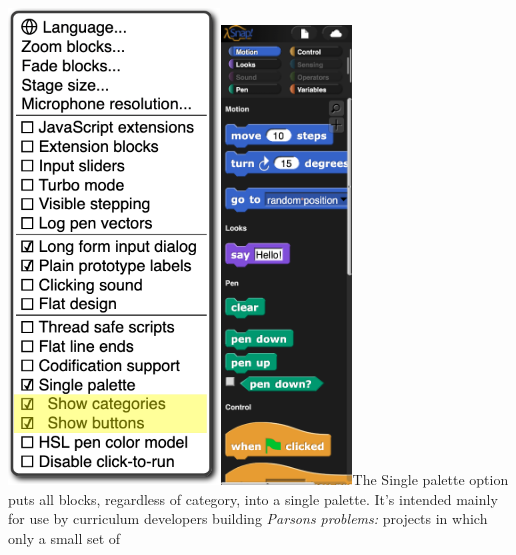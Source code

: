 \includegraphics[width=2.20972in,height=4.96944in]{media/image1027.png}\includegraphics[width=1.38in,height=4.79in]{media/image1028.png}The
Single palette option puts all blocks, regardless of category, into a
single palette. It's intended mainly for use by curriculum developers
building \emph{Parsons problems:} projects in which only a small set of
